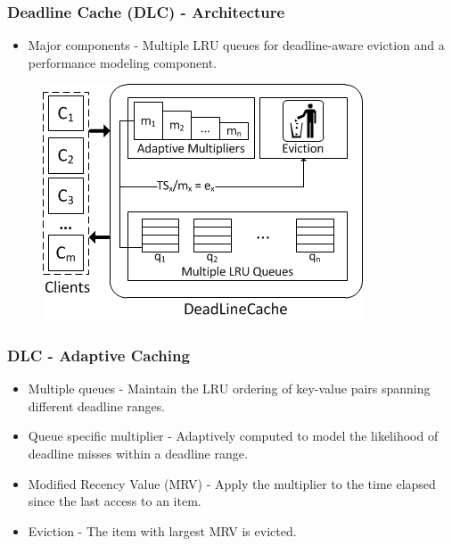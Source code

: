 \documentclass{beamer}
\begin{document}
\begin{frame}
  \frametitle{Deadline Cache (DLC) - Architecture}
  \begin{itemize}
  \item Major components - Multiple LRU queues for deadline-aware eviction and
    a performance modeling component.
  \end{itemize}
  \begin{figure}
    \begin{center}
      \centerline{\includegraphics[scale=0.8]{img/DLC_arch.png}}
    \end{center}
  \end{figure}
\end{frame}


\begin{frame}
  \frametitle{DLC - Adaptive Caching}
  \begin{itemize}
  \item Multiple queues - Maintain the LRU ordering of key-value pairs spanning
    different deadline ranges.
  \item Queue specific multiplier - Adaptively computed to model the likelihood
    of deadline misses within a deadline range.
  \item Modified Recency Value (MRV) - Apply the multiplier to the time elapsed
    since the last access to an item.
  \item Eviction - The item with largest MRV is evicted.
  \end{itemize}
\end{frame}
\end{document}
